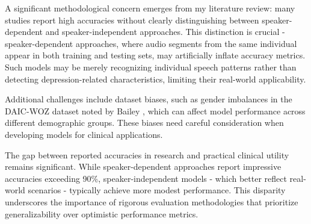 A significant methodological concern emerges from my literature review: many studies report high accuracies without clearly distinguishing between speaker-dependent and speaker-independent approaches. This distinction is crucial - speaker-dependent approaches, where audio segments from the same individual appear in both training and testing sets, may artificially inflate accuracy metrics. Such models may be merely recognizing individual speech patterns rather than detecting depression-related characteristics, limiting their real-world applicability.

Additional challenges include dataset biases, such as gender imbalances in the DAIC-WOZ dataset noted by Bailey \cite{bailey2021gender}, which can affect model performance across different demographic groups. These biases need careful consideration when developing models for clinical applications.

The gap between reported accuracies in research and practical clinical utility remains significant. While speaker-dependent approaches report impressive accuracies exceeding 90\%, speaker-independent models - which better reflect real-world scenarios - typically achieve more modest performance. This disparity underscores the importance of rigorous evaluation methodologies that prioritize generalizability over optimistic performance metrics.